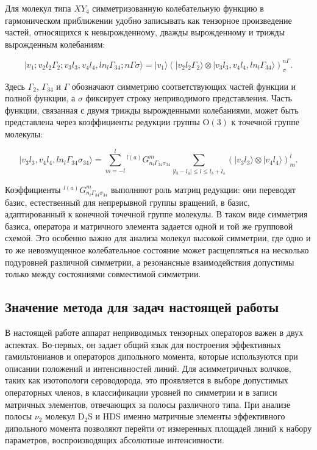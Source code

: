Для молекул типа $XY_4$ симметризованную колебательную функцию в
гармоническом приближении удобно записывать как тензорное произведение
частей, относящихся к невырожденному, дважды вырожденному и трижды
вырожденным колебаниям:

\begin{equation}
|v_1;v_2l_2\Gamma_2;v_3l_3,v_4l_4,l n_l\Gamma_{34};n\Gamma\sigma\rangle=
|v_1\rangle
\left(|v_2l_2\Gamma_2\rangle\otimes
|v_3l_3,v_4l_4,l n_l\Gamma_{34}\rangle\right)^{n\Gamma}_{\sigma}.
\end{equation}

Здесь $\Gamma_2$, $\Gamma_{34}$ и $\Gamma$ обозначают симметрию
соответствующих частей функции и полной функции, а $\sigma$ фиксирует строку
неприводимого представления. Часть функции, связанная с двумя трижды
вырожденными колебаниями, может быть представлена через коэффициенты
редукции группы $\mathrm{O}(3)$ к точечной группе молекулы:

\begin{equation}
|v_3l_3,v_4l_4,l n_l\Gamma_{34}\sigma_{34}\rangle=
\sum_{m=-l}^{l}
{}^{l(a)}G^{m}_{n_l\Gamma_{34}\sigma_{34}}
\sum_{|l_3-l_4|\leq l\leq l_3+l_4}
\left(|v_3l_3\rangle\otimes |v_4l_4\rangle\right)^l_m .
\end{equation}

Коэффициенты ${}^{l(a)}G^{m}_{n_l\Gamma_{34}\sigma_{34}}$ выполняют роль
матриц редукции: они переводят базис, естественный для непрерывной группы
вращений, в базис, адаптированный к конечной точечной группе молекулы. В
таком виде симметрия базиса, оператора и матричного элемента задается одной
и той же групповой схемой. Это особенно важно для анализа молекул высокой
симметрии, где одно и то же невозмущенное колебательное состояние может
расщепляться на несколько подуровней различной симметрии, а резонансные
взаимодействия допустимы только между состояниями совместимой симметрии.

\subsection{Значение метода для задач настоящей работы}

В настоящей работе аппарат неприводимых тензорных операторов важен в двух
аспектах. Во-первых, он задает общий язык для построения эффективных
гамильтонианов и операторов дипольного момента, которые используются при
описании положений и интенсивностей линий. Для асимметричных волчков, таких
как изотопологи сероводорода, это проявляется в выборе допустимых
операторных членов, в классификации уровней по симметрии и в записи
матричных элементов, отвечающих за полосы различного типа. При анализе
полосы $\nu_2$ молекул $\mathrm{D_2S}$ и $\mathrm{HDS}$ именно матричные
элементы эффективного дипольного момента позволяют перейти от измеренных
площадей линий к набору параметров, воспроизводящих абсолютные
интенсивности.

